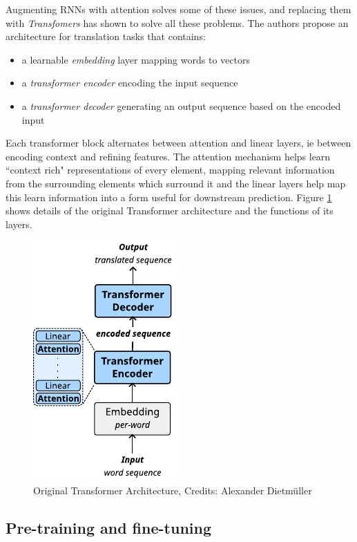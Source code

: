 Augmenting RNNs with attention solves some of these issues\cite{rnnattention},  and replacing them with \emph{Transfomers} has shown to solve all these problems.
The authors propose an architecture for translation tasks that contains:
\begin{itemize}
\item a learnable \emph{embedding} layer mapping words to vectors
\item a \emph{transformer encoder} encoding the input sequence
\item a \emph{transformer decoder} generating an output sequence based on the encoded input
\end{itemize}

Each transformer block alternates between attention and linear layers, ie between encoding context and refining features. The attention mechanism helps learn ``context rich" representations of every element, mapping relevant information from the surrounding elements which surround it and the linear layers help map this learn information into a form useful for downstream prediction. Figure \ref{fig:transformer} shows details of the original Transformer architecture and the functions of its layers.

\begin{figure}[!hbt]
  \begin{center}
    \includegraphics[scale=1.5]{figures/architecture_transformer.pdf}
    \caption{Original Transformer Architecture, Credits: Alexander Dietmüller}
    \label{fig:transformer}
  \end{center}
\end{figure}

\subsection{Pre-training and fine-tuning}
\label{ssec:bgtraining}


